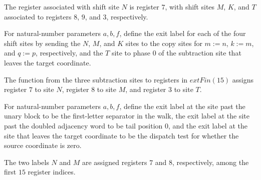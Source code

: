 \begin{definition}
\label{Complexity.PathHard.shReg}
\leanok
{}
The register associated with shift site $N$ is register $7$, with shift sites $M$, $K$,
and $T$ associated to registers $8$, $9$, and $3$, respectively.
\end{definition}

\begin{definition}
\label{Complexity.PathHard.shExit}
\leanok
{}
For natural-number parameters $a,b,f$, define the exit label for each of the four shift
sites by sending the $N$, $M$, and $K$ sites to the copy sites for $m:=n$, $k:=m$, and
$q:=p$, respectively, and the $T$ site to phase $0$ of the subtraction site that leaves
the target coordinate.
\end{definition}

\begin{definition}
\label{Complexity.PathHard.sbReg}
\leanok
{}
The function from the three subtraction sites to registers in $	ext{Fin}(15)$ assigns
register $7$ to site $N$, register $8$ to site $M$, and register $3$ to site $T$.
\end{definition}

\begin{definition}
\label{Complexity.PathHard.sbExit}
\leanok
{}
For natural-number parameters $a,b,f$, define the exit label at the site past the unary
block to be the first-letter separator in the walk, the exit label at the site past the
doubled adjacency word to be tail position $0$, and the exit label at the site that
leaves the target coordinate to be the dispatch test for whether the source coordinate
is zero.
\end{definition}

\begin{definition}
\label{Complexity.PathHard.leReg}
\leanok
{}
The two labels $N$ and $M$ are assigned registers $7$ and $8$, respectively, among the
first $15$ register indices.
\end{definition}

